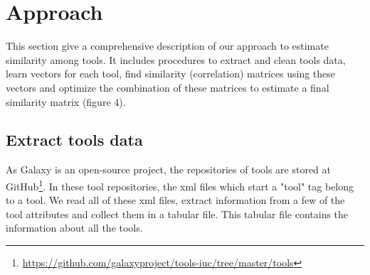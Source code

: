 \chapter{Approach}\label{chap:approach}
This section give a comprehensive description of our approach to estimate similarity among tools. It includes procedures to extract and clean tools data, learn vectors for each tool, find similarity (correlation) matrices using these vectors and optimize the combination of these matrices to estimate a final similarity matrix (figure 4). 
\section{Extract tools data}    
As Galaxy is an open-source project, the repositories of tools are stored at GitHub\footnote{\url{https://github.com/galaxyproject/tools-iuc/tree/master/tools}}. In these tool repositories, the xml files which start a "tool" tag belong to a tool. We read all of these xml files, extract information from a few of the tool attributes and collect them in a tabular file. This tabular file contains the information about all the tools.

